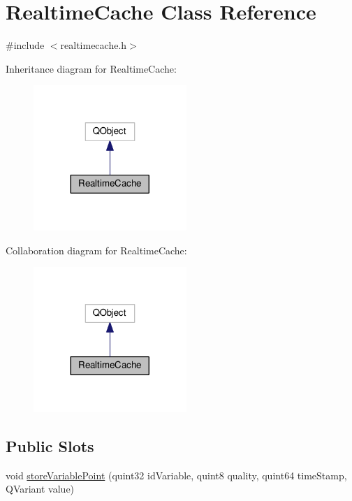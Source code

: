 \hypertarget{class_realtime_cache}{}\section{Realtime\+Cache Class Reference}
\label{class_realtime_cache}


{\ttfamily \#include $<$realtimecache.\+h$>$}



Inheritance diagram for Realtime\+Cache\+:
\nopagebreak
\begin{figure}[H]
\begin{center}
\leavevmode
\includegraphics[width=164pt]{class_realtime_cache__inherit__graph}
\end{center}
\end{figure}


Collaboration diagram for Realtime\+Cache\+:
\nopagebreak
\begin{figure}[H]
\begin{center}
\leavevmode
\includegraphics[width=164pt]{class_realtime_cache__coll__graph}
\end{center}
\end{figure}
\subsection*{Public Slots}
\begin{DoxyCompactItemize}
\item 
void \hyperlink{class_realtime_cache_a9fec88a36d7db8d20bdaa33313efb79e}{store\+Variable\+Point} (quint32 id\+Variable, quint8 quality, quint64 time\+Stamp, Q\+Variant value)
\end{DoxyCompactItemize}
